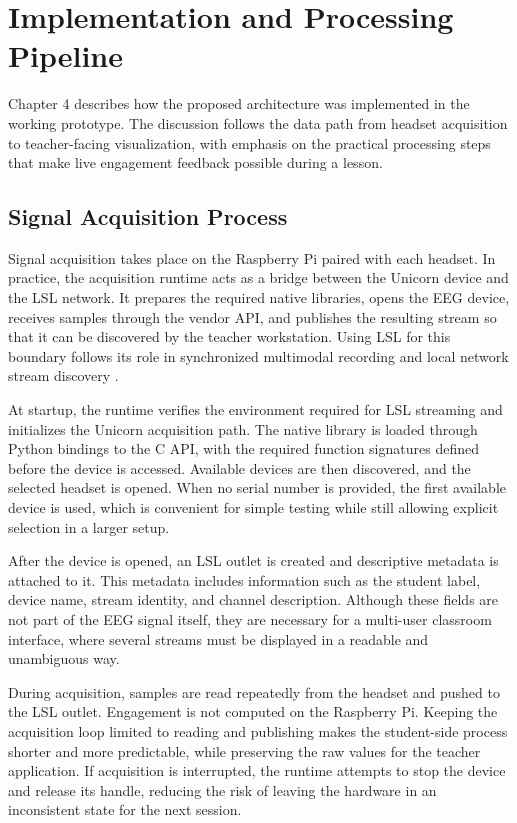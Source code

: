 \chapter{Implementation and Processing Pipeline}\label{cap:implnprocpipe}
Chapter 4 describes how the proposed architecture was implemented in the working prototype. The discussion follows the data path from headset acquisition to teacher-facing visualization, with emphasis on the practical processing steps that make live engagement feedback possible during a lesson.



\section{Signal Acquisition Process}\label{sect:signacqproc}
Signal acquisition takes place on the Raspberry Pi paired with each headset. In practice, the acquisition runtime acts as a bridge between the Unicorn device and the LSL network. It prepares the required native libraries, opens the EEG device, receives samples through the vendor API, and publishes the resulting stream so that it can be discovered by the teacher workstation. Using LSL for this boundary follows its role in synchronized multimodal recording and local network stream discovery \cite{Kothe2025}.


At startup, the runtime verifies the environment required for LSL streaming and initializes the Unicorn acquisition path. The native library is loaded through Python bindings to the C API, with the required function signatures defined before the device is accessed. Available devices are then discovered, and the selected headset is opened. When no serial number is provided, the first available device is used, which is convenient for simple testing while still allowing explicit selection in a larger setup.


After the device is opened, an LSL outlet is created and descriptive metadata is attached to it. This metadata includes information such as the student label, device name, stream identity, and channel description. Although these fields are not part of the EEG signal itself, they are necessary for a multi-user classroom interface, where several streams must be displayed in a readable and unambiguous way.


During acquisition, samples are read repeatedly from the headset and pushed to the LSL outlet. Engagement is not computed on the Raspberry Pi. Keeping the acquisition loop limited to reading and publishing makes the student-side process shorter and more predictable, while preserving the raw values for the teacher application. If acquisition is interrupted, the runtime attempts to stop the device and release its handle, reducing the risk of leaving the hardware in an inconsistent state for the next session.


